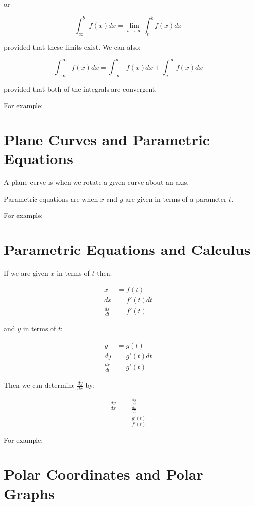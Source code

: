 \documentclass{article}
\begin{document}
or

\[
\int^b_\infty f(x)dx = \lim_{t \to \infty} \int^b_t f(x)dx
\]

provided that these limits exist.  We can also:

\[
\int^\infty_{-\infty} f(x)dx = \int^a_{-\infty}f(x)dx + \int^\infty_a f(x)dx
\]

provided that both of the integrals are convergent.

For example:

\section{Plane Curves and Parametric Equations}

A plane curve is when we rotate a given curve about an axis.

Parametric equations are when $x$ and $y$ are given in terms of a parameter $t$.

For example:

\section{Parametric Equations and Calculus}

If we are given $x$ in terms of $t$ then:

\begin{align*}
  x &= f(t) \\
  dx &= f'(t)dt \\
  \frac{dx}{dt} &= f'(t)
\end{align*}

and $y$ in terms of $t$:

\begin{align*}
  y &= g(t) \\
  dy &= g'(t)dt \\
  \frac{dy}{dt} &= g'(t)
\end{align*}

Then we can determine $\frac{dy}{dx}$ by:

\begin{align*}
  \frac{dy}{dx} &= \frac{ \frac{dy}{dt} }{ \frac{dx}{dt} } \\
  &= \frac{g'(t)}{f'(t)}
\end{align*}

For example:

\section{Polar Coordinates and Polar Graphs}
\end{document}

